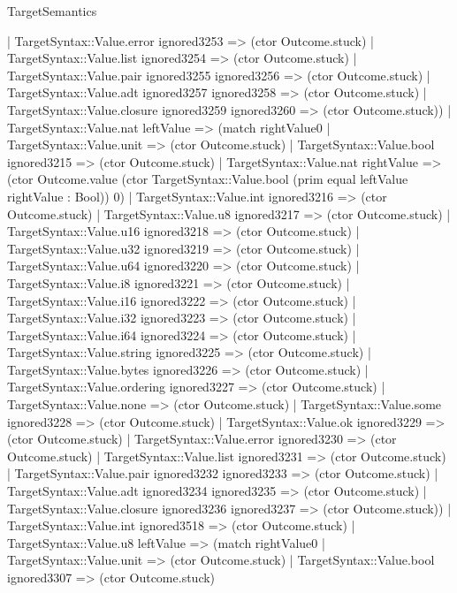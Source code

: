\begin{lexlean}{TargetSemantics}
\begin{semanticmodule}
{              | TargetSyntax::Value.error ignored3253 => (ctor Outcome.stuck)
              | TargetSyntax::Value.list ignored3254 => (ctor Outcome.stuck)
              | TargetSyntax::Value.pair ignored3255 ignored3256 => (ctor Outcome.stuck)
              | TargetSyntax::Value.adt ignored3257 ignored3258 => (ctor Outcome.stuck)
              | TargetSyntax::Value.closure ignored3259 ignored3260 => (ctor Outcome.stuck))
            | TargetSyntax::Value.nat leftValue => (match rightValue0
              | TargetSyntax::Value.unit => (ctor Outcome.stuck)
              | TargetSyntax::Value.bool ignored3215 => (ctor Outcome.stuck)
              | TargetSyntax::Value.nat rightValue => (ctor Outcome.value (ctor TargetSyntax::Value.bool (prim equal leftValue rightValue : Bool)) 0)
              | TargetSyntax::Value.int ignored3216 => (ctor Outcome.stuck)
              | TargetSyntax::Value.u8 ignored3217 => (ctor Outcome.stuck)
              | TargetSyntax::Value.u16 ignored3218 => (ctor Outcome.stuck)
              | TargetSyntax::Value.u32 ignored3219 => (ctor Outcome.stuck)
              | TargetSyntax::Value.u64 ignored3220 => (ctor Outcome.stuck)
              | TargetSyntax::Value.i8 ignored3221 => (ctor Outcome.stuck)
              | TargetSyntax::Value.i16 ignored3222 => (ctor Outcome.stuck)
              | TargetSyntax::Value.i32 ignored3223 => (ctor Outcome.stuck)
              | TargetSyntax::Value.i64 ignored3224 => (ctor Outcome.stuck)
              | TargetSyntax::Value.string ignored3225 => (ctor Outcome.stuck)
              | TargetSyntax::Value.bytes ignored3226 => (ctor Outcome.stuck)
              | TargetSyntax::Value.ordering ignored3227 => (ctor Outcome.stuck)
              | TargetSyntax::Value.none => (ctor Outcome.stuck)
              | TargetSyntax::Value.some ignored3228 => (ctor Outcome.stuck)
              | TargetSyntax::Value.ok ignored3229 => (ctor Outcome.stuck)
              | TargetSyntax::Value.error ignored3230 => (ctor Outcome.stuck)
              | TargetSyntax::Value.list ignored3231 => (ctor Outcome.stuck)
              | TargetSyntax::Value.pair ignored3232 ignored3233 => (ctor Outcome.stuck)
              | TargetSyntax::Value.adt ignored3234 ignored3235 => (ctor Outcome.stuck)
              | TargetSyntax::Value.closure ignored3236 ignored3237 => (ctor Outcome.stuck))
            | TargetSyntax::Value.int ignored3518 => (ctor Outcome.stuck)
            | TargetSyntax::Value.u8 leftValue => (match rightValue0
              | TargetSyntax::Value.unit => (ctor Outcome.stuck)
              | TargetSyntax::Value.bool ignored3307 => (ctor Outcome.stuck)
}
\end{semanticmodule}
\end{lexlean}
